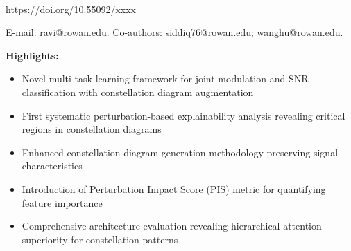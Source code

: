 \documentclass{ELSP}
\begin{document}
\thispagestyle{firstpage}

\let\thefootnote\relax
{}

\begin{flushleft}
{\sffamily \small {}}\\
{\sffamily\small{https://doi.org/10.55092/xxxx}}




 {E-mail: ravi@rowan.edu. Co-authors: siddiq76@rowan.edu; wanghu@rowan.edu.}
\end{flushleft}

\noindent\textbf{\textcolor[RGB]{0,131,255}{Highlights:}}\\
\newline
\begin{itemize}
    \item Novel multi-task learning framework for joint modulation and SNR classification with constellation diagram augmentation
    \item First systematic perturbation-based explainability analysis revealing critical regions in constellation diagrams
    \item Enhanced constellation diagram generation methodology preserving signal characteristics
    \item Introduction of Perturbation Impact Score (PIS) metric for quantifying feature importance
    \item Comprehensive architecture evaluation revealing hierarchical attention superiority for constellation patterns
\end{itemize}
\end{document}
